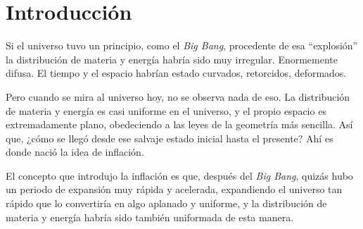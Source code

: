 \chapter{Introducción}
Si el universo tuvo un principio, como el \textit{Big Bang}, procedente de esa ``explosión'' la distribución de materia y energía habría sido muy irregular. Enormemente difusa. El tiempo y el espacio habrían estado curvados, retorcidos, deformados.

Pero cuando se mira al universo hoy, no se observa nada de eso. La distribución de materia y energía es casi uniforme en el universo, y el propio espacio es extremadamente plano, obedeciendo a las leyes de la geometría más sencilla. Así que, ¿cómo se llegó desde ese salvaje estado inicial hasta el presente? Ahí es donde nació la idea de inflación.

El concepto que introdujo la inflación es que, después del \textit{Big Bang}, quizás hubo un periodo de expansión muy rápida y acelerada, expandiendo el universo tan rápido que lo convertiría en algo aplanado y uniforme, y la distribución de materia y energía habría sido también uniformada de esta manera.

